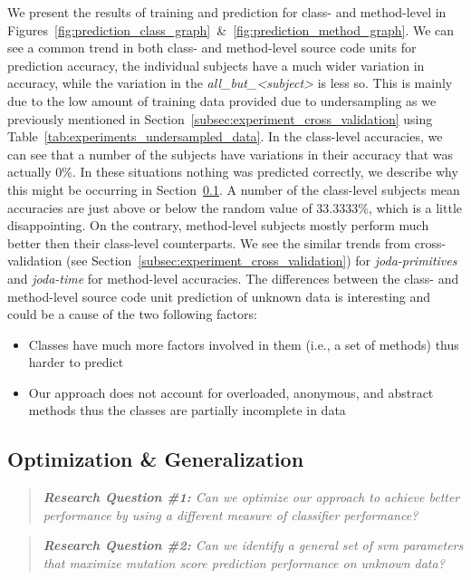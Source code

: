 We present the results of training and prediction for class- and method-level in Figures~\ref{fig:prediction_class_graph}~\&~\ref{fig:prediction_method_graph}. We can see a common trend in both class- and method-level source code units for prediction accuracy, the individual subjects have a much wider variation in accuracy, while the variation in the \emph{all\_but\_<subject>} is less so. This is mainly due to the low amount of training data provided due to undersampling as we previously mentioned in Section~\ref{subsec:experiment_cross_validation} using Table~\ref{tab:experiments_undersampled_data}. In the class-level accuracies, we can see that a number of the subjects have variations in their accuracy that was actually 0\%. In these situations nothing was predicted correctly, we describe why this might be occurring in Section~\ref{subsec:experiment_optimization_generalization}. A number of the class-level subjects mean accuracies are just above or below the random value of 33.3333\%, which is a little disappointing. On the contrary, method-level subjects mostly perform much better then their class-level counterparts. We see the similar trends from cross-validation (see Section~\ref{subsec:experiment_cross_validation}) for \emph{joda-primitives} and \emph{joda-time} for method-level accuracies. The differences between the class- and method-level source code unit prediction of unknown data is interesting and could be a cause of the two following factors:

\begin{itemize}
  \item Classes have much more factors involved in them (i.e., a set of methods) thus harder to predict
  \item Our approach does not account for overloaded, anonymous, and abstract methods thus the classes are partially incomplete in data
\end{itemize}


\subsection{Optimization \& Generalization}
\label{subsec:experiment_optimization_generalization}
\begin{quote}
	\emph{\textbf{Research Question \#1:} Can we optimize our approach to achieve better performance by using a different measure of classifier performance?}
\end{quote}

\begin{quote}
  \emph{\textbf{Research Question \#2:} Can we identify a general set of \gls{svm} parameters that maximize mutation score prediction performance on unknown data?}
\end{quote}

